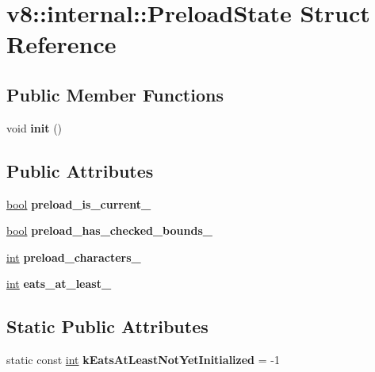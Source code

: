 \hypertarget{structv8_1_1internal_1_1PreloadState}{}\section{v8\+:\+:internal\+:\+:Preload\+State Struct Reference}
\label{structv8_1_1internal_1_1PreloadState}
\subsection*{Public Member Functions}
\begin{DoxyCompactItemize}
\item 
\mbox{\label{structv8_1_1internal_1_1PreloadState_a17d85eaccbac6f3aee69903ad5fb3648}} 
void {\bfseries init} ()
\end{DoxyCompactItemize}
\subsection*{Public Attributes}
\begin{DoxyCompactItemize}
\item 
\mbox{\label{structv8_1_1internal_1_1PreloadState_a80ab5e8b22cd6f8147148eddcd68024f}} 
\mbox{\hyperlink{classbool}{bool}} {\bfseries preload\+\_\+is\+\_\+current\+\_\+}
\item 
\mbox{\label{structv8_1_1internal_1_1PreloadState_a615484cf86c9f9f74225429ac40c0def}} 
\mbox{\hyperlink{classbool}{bool}} {\bfseries preload\+\_\+has\+\_\+checked\+\_\+bounds\+\_\+}
\item 
\mbox{\label{structv8_1_1internal_1_1PreloadState_ab2a09b111ad1ecc901bd3219e799b764}} 
\mbox{\hyperlink{classint}{int}} {\bfseries preload\+\_\+characters\+\_\+}
\item 
\mbox{\label{structv8_1_1internal_1_1PreloadState_a64fb7ad1d7ed2245b44e2a9e0ae94be8}} 
\mbox{\hyperlink{classint}{int}} {\bfseries eats\+\_\+at\+\_\+least\+\_\+}
\end{DoxyCompactItemize}
\subsection*{Static Public Attributes}
\begin{DoxyCompactItemize}
\item 
\mbox{\label{structv8_1_1internal_1_1PreloadState_a376c50368dd5b24b0029a99b2c6538b6}} 
static const \mbox{\hyperlink{classint}{int}} {\bfseries k\+Eats\+At\+Least\+Not\+Yet\+Initialized} = -\/1
\end{DoxyCompactItemize}


